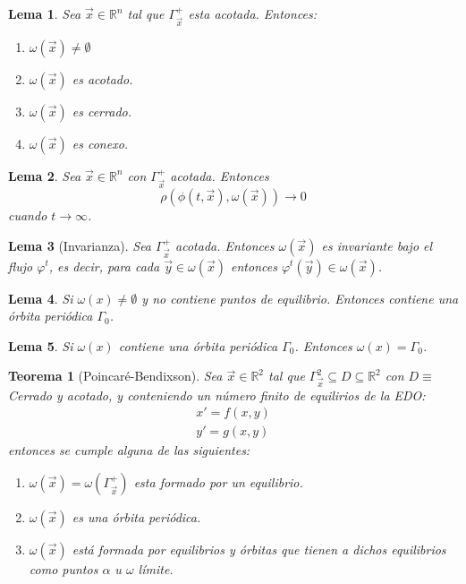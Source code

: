 \documentclass[12pt, a4paper]{report}
\newtheorem{lemma}{Lema}
\newtheorem{theorem}{Teorema}
\begin{document}
\begin{lemma}
	Sea $\vec{x}\in\mathbb{R}^n$ tal que $\Gamma_{\vec{x}}^+$ esta acotada.
	Entonces:
	\begin{enumerate}
		\item $\omega(\vec{x})\neq\emptyset$
		\item $\omega(\vec{x})$ es acotado.
		\item $\omega(\vec{x})$ es cerrado.
		\item $\omega(\vec{x})$ es conexo.
	\end{enumerate}
\end{lemma}

\begin{lemma}
	Sea $\vec{x}\in\mathbb{R}^n$ con $\Gamma_{\vec{x}}^+$ acotada.
	Entonces
	$$\rho(\phi(t,\vec{x}),\omega(\vec{x}))\to0$$
	cuando $t \to \infty$.
\end{lemma}

\begin{lemma}[Invarianza]
	Sea $\Gamma_{\vec{x}}^+$ acotada. Entonces $\omega(\vec{x})$
	es invariante bajo el flujo
	$\varphi^t$, es decir, para cada $\vec{y}\in\omega(\vec{x})$ entonces
	$\varphi ^t(\vec{y})\in\omega(\vec{x})$.
\end{lemma}

\begin{lemma}
	Si $\omega(x)\neq\emptyset$ y no contiene puntos de equilibrio. Entonces contiene una órbita periódica $\varGamma_0$.
\end{lemma}

\begin{lemma}
	Si $\omega(x)$ contiene una órbita periódica $\varGamma_0$. Entonces $\omega(x)=\varGamma_0$.
\end{lemma}

\begin{theorem}[Poincaré-Bendixson]\label{TPB}
	Sea $\vec{x}\in\mathbb{R}^2$ tal que $\varGamma_{\vec{x}}^2\subseteq D\subseteq\mathbb{R}^2$ con $D\equiv$ Cerrado y acotado, 
	y conteniendo un número finito de equilirios de la EDO:
	\begin{equation}
		\begin{matrix}
			x' = f(x,y) \\
			y' = g(x,y)
		\end{matrix}
	\end{equation}
	entonces se cumple alguna de las siguientes:
	\begin{enumerate}
		\item $\omega(\vec{x})=\omega(\varGamma_{\vec{x}}^+)$ esta formado por un equilibrio.
		\item $\omega(\vec{x})$ es una órbita periódica.
		\item $\omega(\vec{x})$ está formada por equilibrios y órbitas que tienen a dichos equilibrios como puntos 
		$\alpha$ u $\omega$ límite.
	\end{enumerate}
\end{theorem}
\end{document}
